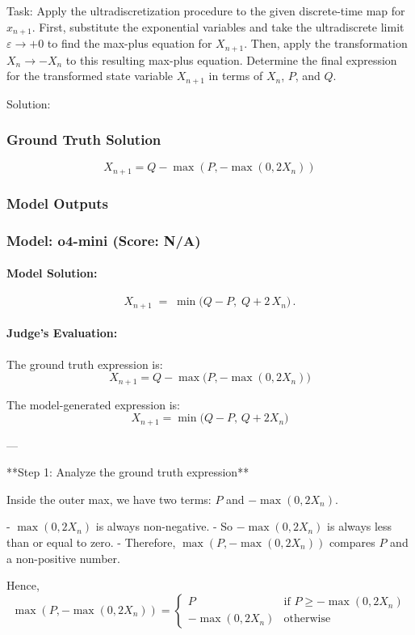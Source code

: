 \documentclass[10pt]{article}
\begin{document}
Task:
Apply the ultradiscretization procedure to the given discrete-time map for $x_{n+1}$. First, substitute the exponential variables and take the ultradiscrete limit $\varepsilon \to +0$ to find the max-plus equation for $X_{n+1}$. Then, apply the transformation $X_n \to -X_n$ to this resulting max-plus equation. Determine the final expression for the transformed state variable $X_{n+1}$ in terms of $X_n$, $P$, and $Q$.

Solution:

\subsubsection*{Ground Truth Solution}
\[ \boxed{X_{n+1}  =  Q-\max(P,-\max(0,2X_n))} \]

\subsubsection*{Model Outputs}
\subsubsection*{Model: o4-mini (Score: N/A)}
\paragraph*{Model Solution:}
\[ X_{n+1}\;=\;\min\!\bigl(Q-P,\;Q+2\,X_n\bigr)\,. \]

\paragraph*{Judge's Evaluation:}

The ground truth expression is:
\[
X_{n+1} = Q - \max\bigl(P, -\max(0, 2X_n)\bigr)
\]

The model-generated expression is:
\[
X_{n+1} = \min\bigl(Q - P,\, Q + 2X_n\bigr)
\]

---

**Step 1: Analyze the ground truth expression**

Inside the outer max, we have two terms: \(P\) and \(-\max(0, 2X_n)\).

- \(\max(0, 2X_n)\) is always non-negative.
- So \(-\max(0, 2X_n)\) is always less than or equal to zero.
- Therefore, \(\max(P, -\max(0, 2X_n))\) compares \(P\) and a non-positive number.

Hence,
\[
\max(P, -\max(0, 2X_n)) = \begin{cases}
P & \text{if } P \geq -\max(0, 2X_n) \\
-\max(0, 2X_n) & \text{otherwise}
\end{cases}
\]
\end{document}
